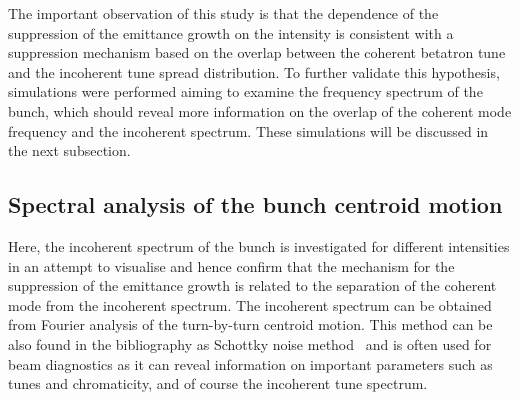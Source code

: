 The important observation of this study is that the dependence of the suppression of the emittance growth on the intensity is consistent with a suppression mechanism based on the overlap between the coherent betatron tune and the incoherent tune spread distribution. To further validate this hypothesis, simulations were performed aiming to examine the frequency spectrum of the bunch, which should reveal more information on the overlap of the coherent mode frequency and the incoherent spectrum. These simulations will be discussed in the next subsection.


\subsection{Spectral analysis of the bunch centroid motion}\label{subsec:spectral_analysis_schottky}
Here, the incoherent spectrum of the bunch is investigated for different intensities in an attempt to visualise and hence confirm that the mechanism for the suppression of the emittance growth is related to the separation of the coherent mode from the incoherent spectrum. The incoherent spectrum can be obtained from Fourier analysis of the turn-by-turn centroid motion. This method can be also found in the bibliography as Schottky noise method~\cite{Caspers:1213284} and is often used for beam diagnostics as it can reveal information on important parameters such as tunes and chromaticity, and of course the incoherent tune spectrum.


